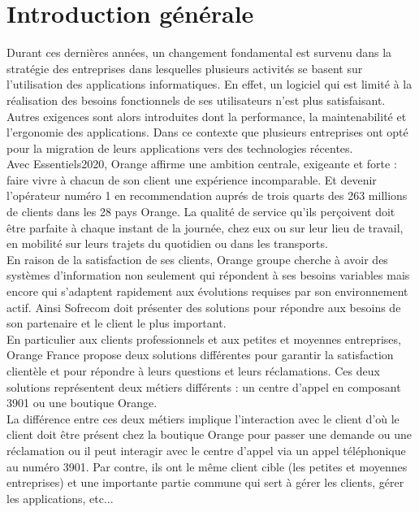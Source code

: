 \chapter*{Introduction générale}
Durant ces dernières années, un changement fondamental est survenu dans la stratégie des entreprises dans lesquelles plusieurs activités se basent sur l'utilisation des applications informatiques. En effet, un logiciel qui est limité à la réalisation des besoins fonctionnels de ses utilisateurs n'est plus satisfaisant. Autres exigences sont alors introduites dont la performance, la maintenabilité et l'ergonomie des applications. Dans ce contexte que plusieurs entreprises ont opté pour la migration de leurs applications vers des technologies récentes.\\ \newline
Avec Essentiels2020\cite{essentiels2020}, Orange affirme une ambition centrale, exigeante et forte : faire vivre à chacun de son client une expérience incomparable. Et devenir l’opérateur numéro 1 en recommendation auprés de trois quarts des 263 millions de clients dans les 28 pays Orange. La qualité de service qu’ils perçoivent doit être parfaite à chaque instant de la journée, chez eux ou sur leur lieu de travail, en mobilité sur leurs trajets du quotidien ou dans les transports.\\ \newline
En raison de la satisfaction de ses clients, Orange groupe cherche à avoir des systèmes d'information non seulement qui répondent à ses besoins variables mais encore qui s'adaptent rapidement aux évolutions requises par son environnement actif. Ainsi Sofrecom doit présenter des solutions pour répondre aux besoins de son partenaire et le client le plus important.\\ \newline
En particulier aux clients professionnels et aux petites et moyennes entreprises, Orange  France propose deux solutions différentes pour garantir la satisfaction clientèle et pour répondre à leurs questions et leurs réclamations. Ces deux solutions représentent deux métiers différents : un centre d’appel en composant 3901 ou une boutique Orange.\\ \newline
La différence entre ces deux métiers implique l’interaction avec le client d’où le client doit être présent chez la boutique Orange pour passer une demande ou une réclamation ou il peut interagir avec le centre d’appel  via un appel téléphonique au numéro 3901. Par contre, ils ont le même client cible (les petites et moyennes entreprises) et une importante partie commune qui sert à gérer les clients, gérer les applications, etc...
